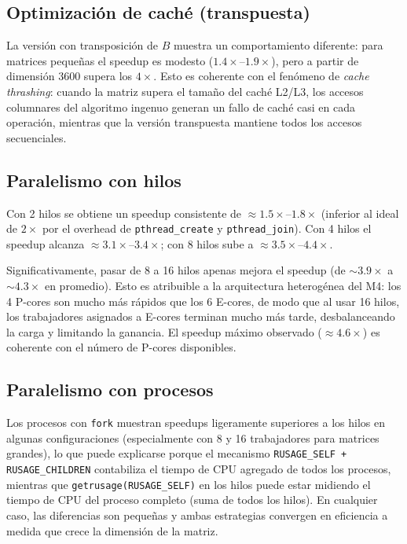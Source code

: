 \documentclass{article}
\begin{document}
\subsection{Optimización de caché (transpuesta)}

La versión con transposición de $B$ muestra un comportamiento diferente: para matrices pequeñas el speedup es modesto ($1.4\times$--$1.9\times$), pero a partir de dimensión 3600 supera los $4\times$. Esto es coherente con el fenómeno de \emph{cache thrashing}: cuando la matriz supera el tamaño del caché L2/L3, los accesos columnares del algoritmo ingenuo generan un fallo de caché casi en cada operación, mientras que la versión transpuesta mantiene todos los accesos secuenciales.

\subsection{Paralelismo con hilos}

Con 2 hilos se obtiene un speedup consistente de $\approx 1.5\times$--$1.8\times$ (inferior al ideal de $2\times$ por el overhead de \texttt{pthread\_create} y \texttt{pthread\_join}). Con 4 hilos el speedup alcanza $\approx 3.1\times$--$3.4\times$; con 8 hilos sube a $\approx 3.5\times$--$4.4\times$.

Significativamente, pasar de 8 a 16 hilos apenas mejora el speedup (de $\sim 3.9\times$ a $\sim 4.3\times$ en promedio). Esto es atribuible a la arquitectura heterogénea del M4: los 4 P-cores son mucho más rápidos que los 6 E-cores, de modo que al usar 16 hilos, los trabajadores asignados a E-cores terminan mucho más tarde, desbalanceando la carga y limitando la ganancia. El speedup máximo observado ($\approx 4.6\times$) es coherente con el número de P-cores disponibles.

\subsection{Paralelismo con procesos}

Los procesos con \texttt{fork} muestran speedups ligeramente superiores a los hilos en algunas configuraciones (especialmente con 8 y 16 trabajadores para matrices grandes), lo que puede explicarse porque el mecanismo \texttt{RUSAGE\_SELF + RUSAGE\_CHILDREN} contabiliza el tiempo de CPU agregado de todos los procesos, mientras que \texttt{getrusage(RUSAGE\_SELF)} en los hilos puede estar midiendo el tiempo de CPU del proceso completo (suma de todos los hilos). En cualquier caso, las diferencias son pequeñas y ambas estrategias convergen en eficiencia a medida que crece la dimensión de la matriz.
\end{document}
